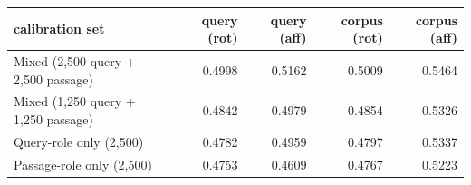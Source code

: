 \begin{tabular}{lrrrr}
\toprule
calibration set & query (rot) & query (aff) & corpus (rot) & corpus (aff) \\
\midrule
Mixed (2,500 query + 2,500 passage) & 0.4998 & 0.5162 & 0.5009 & 0.5464 \\
Mixed (1,250 query + 1,250 passage) & 0.4842 & 0.4979 & 0.4854 & 0.5326 \\
Query-role only (2,500) & 0.4782 & 0.4959 & 0.4797 & 0.5337 \\
Passage-role only (2,500) & 0.4753 & 0.4609 & 0.4767 & 0.5223 \\
\bottomrule
\end{tabular}